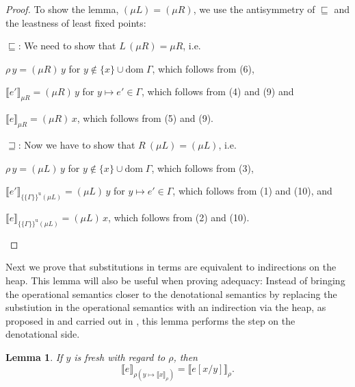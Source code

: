\documentclass[twopage]{scrartcl}
\newtheorem{lemma}{Lemma}
\theoremstyle{nonumberbreak}
\newtheorem{proof}{Proof}
\newcommand{\dom}[1]{\text{dom}\;#1}
\newcommand{\dsem}[2]{\llbracket #1 \rrbracket_{#2}}
\newcommand{\esemu}[1]{\{\!\!\!\{#1\}\!\!\!\}^{\text{u}}}
\begin{document}
\begin{proof}
To show the lemma, $(\mu L) = (\mu R)$, we use the antisymmetry of $\sqsubseteq$ and the leastness of least fixed points:
\begin{compactitem}[$\sqsubseteq$:]
\item[$\sqsubseteq$:] We need to show that $L\, (\mu R) = \mu R$, i.e.
\begin{compactitem}
\item $\rho\,y = (\mu R)\, y$ for $y \notin \{x\}\cup \dom\Gamma$, which follows from (6),
\item $\dsem{e'}{\mu R} = (\mu R)\, y$ for $y \mapsto e' \in \Gamma$, which follows from (4) and (9) and
\item $\dsem{e}{\mu R} = (\mu R)\, x$, which follows from (5) and (9).
\end{compactitem}
\item[$\sqsupseteq$:] Now we have to show that $R\ (\mu L) = (\mu L)$, i.e.
\begin{compactitem}
\item $\rho\,y = (\mu L)\, y$ for $y \notin \{x\}\cup \dom\Gamma$, which follows from (3),
\item $\dsem{e'}{\esemu{\Gamma}{(\mu L)}} = (\mu L)\, y$ for $y \mapsto e' \in \Gamma$, which follows from (1) and (10), and
\item $\dsem{e}{\esemu{\Gamma}{(\mu L)}} = (\mu L)\, x$, which follows from (2) and (10).
\end{compactitem}
\end{compactitem}
\end{proof}

Next we prove that substitutions in terms are equivalent to indirections on the heap. This lemma will also be useful when proving adequacy: Instead of bringing the operational semantics closer to the denotational semantics by replacing the substiution in the operational semantics with an indirection via the heap, as proposed in \cite{launchbury} and carried out in \cite{indirections}, this lemma performs the step on the denotational side.

\begin{lemma}
If $y$ is fresh with regard to $\rho$, then
\label{lem:subst}
\[
\dsem{e}{\rho (y \mapsto \dsem{x}\rho)} = \dsem{ e[x/y]}{\rho}.
\]
\end{lemma}
\end{document}

